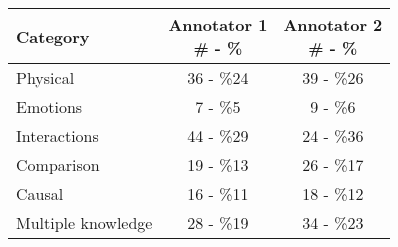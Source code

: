 
\begin{tabular}{ | l | c | c | }
    \hline
    \textbf{Category}  & \makecell{\textbf{Annotator 1}\\ \# - \%}  & \makecell{\textbf{Annotator 2}\\ \# - \%}\\ \hline
    Physical & 36 - \%24 & 39 - \%26 \\\hline
    Emotions & 7 - \%5 & 9 - \%6 \\\hline
    Interactions & 44 - \%29 & 24 - \%36 \\\hline
    Comparison & 19 - \%13 & 26 - \%17 \\\hline
    Causal & 16 - \%11 & 18 - \%12 \\\hline
    Multiple knowledge & 28 - \%19 & 34 - \%23\\\hline
\end{tabular}

